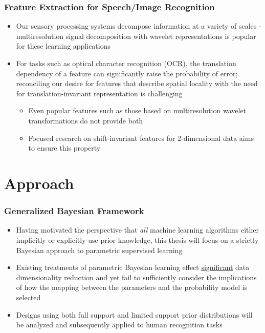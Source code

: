 \documentclass[aspectratio=169,usenames,dvipsnames]{beamer}
\begin{document}
\begin{frame}
\frametitle{Feature Extraction for Speech/Image Recognition}

\begin{itemize}
\item Our sensory processing systems decompose information at a variety of scales - multiresolution signal decomposition with wavelet representations  is popular for these learning applications
\vspace{1em}
\item For tasks such as optical character recognition (OCR), the translation dependency of a feature can significantly raise the probability of error; reconciling our desire for features that describe spatial locality with the need for translation-invariant representation is challenging
	\vspace{0.25em}
	\begin{itemize}
	\item Even popular features such as those based on multiresolution wavelet transformations  do not provide both
	\vspace{0.25em}
	\item Focused research on shift-invariant features for 2-dimensional data  aims to ensure this property
	\end{itemize}
\end{itemize}

\end{frame}









\section{Approach}


\begin{frame}
\frametitle{Generalized Bayesian Framework}

\begin{itemize}
\item Having motivated the perspective that \emph{all} machine learning algorithms either implicitly or explicitly use prior knowledge, this thesis will focus on a strictly \alert{Bayesian approach} to parametric supervised learning
\vspace{1em}
\item Existing treatments of parametric Bayesian learning effect \underline{significant} data dimensionality reduction and yet fail to sufficiently consider the implications of how the mapping between the parameters and the probability model is selected
\vspace{1em}
\item Designs using both \alert{full support} and \alert{limited support} prior distributions will be analyzed and subsequently applied to human recognition tasks
\end{itemize}

\end{frame}
\end{document}
